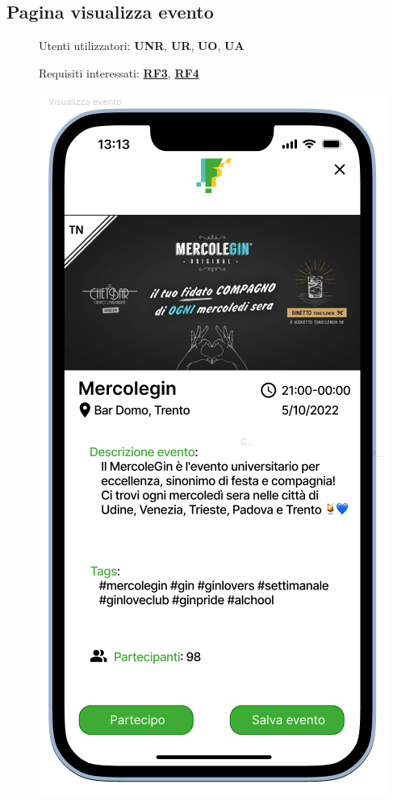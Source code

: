 \documentclass{article}
\begin{document}
\subsection{Pagina visualizza evento}
\begin{description}
    \item[] Utenti utilizzatori: \textbf{UNR}, \textbf{UR}, \textbf{UO}, \textbf{UA}
    \item[] Requisiti interessati: \hyperref[rf_3]{\textbf{RF3}}, \hyperref[rf_4]{\textbf{RF4}}
    \item[] \begin{center}
              \includegraphics[scale=0.6]{Visualizza_Evento.png}

\end{center}
\end{description}
\end{document}
